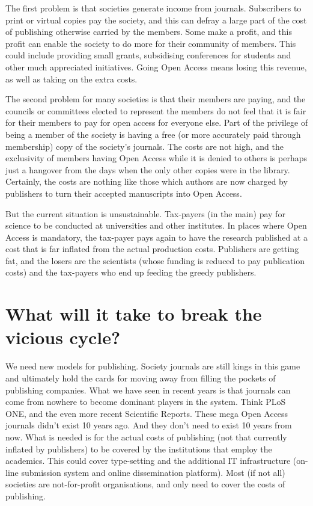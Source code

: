 \documentclass[
]{krantz}
\begin{document}
The first problem is that societies generate income from journals. Subscribers to print or virtual copies pay the society, and this can defray a large part of the cost of publishing otherwise carried by the members. Some make a profit, and this profit can enable the society to do more for their community of members. This could include providing small grants, subsidising conferences for students and other much appreciated initiatives. Going Open Access means losing this revenue, as well as taking on the extra costs.

The second problem for many societies is that their members are paying, and the councils or committees elected to represent the members do not feel that it is fair for their members to pay for open access for everyone else. Part of the privilege of being a member of the society is having a free (or more accurately paid through membership) copy of the society's journals. The costs are not high, and the exclusivity of members having Open Access while it is denied to others is perhaps just a hangover from the days when the only other copies were in the library. Certainly, the costs are nothing like those which authors are now charged by publishers to turn their accepted manuscripts into Open Access.

But the current situation is unsustainable. Tax-payers (in the main) pay for science to be conducted at universities and other institutes. In places where Open Access is mandatory, the tax-payer pays again to have the research published at a cost that is far inflated from the actual production costs. Publishers are getting fat, and the losers are the scientists (whose funding is reduced to pay publication costs) and the tax-payers who end up feeding the greedy publishers.

\hypertarget{what-will-it-take-to-break-the-vicious-cycle}{%
\section{What will it take to break the vicious cycle?}\label{what-will-it-take-to-break-the-vicious-cycle}}

We need new models for publishing. Society journals are still kings in this game and ultimately hold the cards for moving away from filling the pockets of publishing companies. What we have seen in recent years is that journals can come from nowhere to become dominant players in the system. Think PLoS ONE, and the even more recent Scientific Reports. These mega Open Access journals didn't exist 10 years ago. And they don't need to exist 10 years from now. What is needed is for the actual costs of publishing (not that currently inflated by publishers) to be covered by the institutions that employ the academics. This could cover type-setting and the additional IT infrastructure (on-line submission system and online dissemination platform). Most (if not all) societies are not-for-profit organisations, and only need to cover the costs of publishing.
\end{document}
